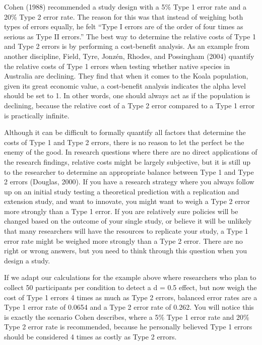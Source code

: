 \documentclass[
  english,
  ,jou, a4paper,floatsintext]{apa6}
\begin{document}
Cohen (1988) recommended a study design with a 5\% Type 1 error rate and a 20\% Type 2 error rate. The reason for this was that instead of weighing both types of errors equally, he felt ``Type I errors are of the order of four times as serious as Type II errors.'' The best way to determine the relative costs of Type 1 and Type 2 errors is by performing a cost-benefit analysis. As an example from another discipline, Field, Tyre, Jonzén, Rhodes, and Possingham (2004) quantify the relative costs of Type 1 errors when testing whether native species in Australia are declining. They find that when it comes to the Koala population, given its great economic value, a cost-benefit analysis indicates the alpha level should be set to 1. In other words, one should always act as if the population is declining, because the relative cost of a Type 2 error compared to a Type 1 error is practically infinite.

Although it can be difficult to formally quantify all factors that determine the costs of Type 1 and Type 2 errors, there is no reason to let the perfect be the enemy of the good. In research questions where there are no direct applications of the research findings, relative costs might be largely subjective, but it is still up to the researcher to determine an appropriate balance between Type 1 and Type 2 errors (Douglas, 2000). If you have a research strategy where you always follow up on an initial study testing a theoretical prediction with a replication and extension study, and want to innovate, you might want to weigh a Type 2 error more strongly than a Type 1 error. If you are relatively sure policies will be changed based on the outcome of your single study, or believe it will be unlikely that many researchers will have the resources to replicate your study, a Type 1 error rate might be weighed more strongly than a Type 2 error. There are no right or wrong answers, but you need to think through this question when you design a study.

If we adapt our calculations for the example above where researchers who plan to collect 50 participants per condition to detect a d = 0.5 effect, but now weigh the cost of Type 1 errors 4 times as much as Type 2 errors, balanced error rates are a Type 1 error rate of 0.0654 and a Type 2 error rate of 0.262. You will notice this is exactly the scenario Cohen describes, where a 5\% Type 1 error rate and 20\% Type 2 error rate is recommended, because he personally believed Type 1 errors should be considered 4 times as costly as Type 2 errors.
\end{document}

